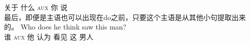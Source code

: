      关于 什么 \textsc{aux} 你 说\\ 
\zl
最后，即便是主语也可以出现在do之前，只要这个主语是从其他小句提取出来的。
\ea
\settowidth{}
\gll Who does he think saw this man?\\   
     谁 \textsc{aux} 他 认为 看见 这 男人\\
\z
%
%

